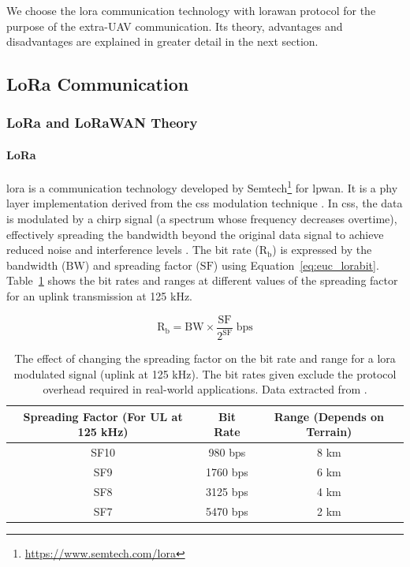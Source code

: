 We choose the \gls{lora} communication technology with \gls{lorawan} protocol for the purpose of the extra-\gls{UAV} communication. Its theory, advantages and disadvantages are explained in greater detail in the next section. 

\subsection{LoRa Communication}
\label{sec:euc_lora}

\subsubsection{LoRa and LoRaWAN Theory}

\paragraph{LoRa} \gls{lora} is a communication technology developed by Semtech\footnote{\url{https://www.semtech.com/lora}} for \gls{lpwan}. It is a \gls{phy} layer implementation derived from the \gls{css} modulation technique \cite{semtech2024lora}. In \gls{css}, the data is modulated by a chirp signal (a spectrum whose frequency decreases overtime), effectively spreading the bandwidth beyond the original data signal to achieve reduced noise and interference levels \cite{devalal2018lora}. The bit rate ($\mathrm{R_b}$) is expressed by the bandwidth ($\mathrm{BW}$) and spreading factor ($\mathrm{SF}$) using Equation~\ref{eq:euc_lorabit}. Table~\ref{tab:euc_lorasf} shows the bit rates and ranges at different values of the spreading factor for an uplink transmission at 125 kHz. 

\begin{equation} 
\label{eq:euc_lorabit}
\mathrm{R_b} = \mathrm{BW} \times \frac{\mathrm{SF}}{2^{\mathrm{SF}}} \; \mathrm{bps}
\end{equation}

\begin{table}[h!]
    \centering
    \begin{tabular}{|c|c|c|}
    \hline
        \textbf{Spreading Factor} (For UL at 125 kHz) & \textbf{Bit Rate} & \textbf{Range} (Depends on Terrain) \\
    \hline\hline
        SF10 & 980 bps & 8 km \\
    \hline
        SF9 & 1760 bps & 6 km \\
    \hline
        SF8 & 3125 bps & 4 km \\
    \hline
        SF7 & 5470 bps & 2 km \\
    \hline
    \end{tabular}
    \caption[LoRa Spreading Factors' Effect on Bit Rate and Range]{The effect of changing the spreading factor on the bit rate and range for a \gls{lora} modulated signal (uplink at 125 kHz). The bit rates given exclude the protocol overhead required in real-world applications. Data extracted from \cite{semtech2024lora}.}
    \label{tab:euc_lorasf}
\end{table}

